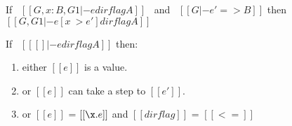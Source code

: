 \begin{lemma}[Substitution]
\label{lemma:union:substitution}
  If \ $[[G, x:B , G1 |- e dirflag A]]$ \ and \ $[[G |- e' => B]]$
  then \ $[[G, G1 |- e [ x ~> e' ] dirflag A]]$
\end{lemma}

\begin{lemma}[Progress]
\label{lemma:union:progress}
If \ $[[ [] |- e dirflag A]]$ then:
 \begin{enumerate}
  \item either $[[e]]$ is a value.
  \item or $[[e]]$ can take a step to $[[e']]$.
  \item or $[[e]]$ = $[[\x.e]]$ and $[[dirflag]]$ = $[[<=]]$
  \end{enumerate}
\end{lemma}

\begin{comment}
\begin{proof}
By induction on typing relation.
  \begin{itemize}
    \item Cases \rref{typ-int, typ-var, typ-app, typ-sub, typ-abs} are trivial to prove.
    \item Case \rref{typ-anno} requires \cref{lemma:union:value-not-value}.
    \item Case \rref{typ-typeof} requires 
    \cref{lemma:union:check-pexpr-ann,lemma:union:check-or-typ,lemma:union:pexpr-inf-typ}.
  \end{itemize}
\end{proof}

\begin{lemma}[Value Decidability]
\label{lemma:union:value-not-value}
$\forall$ $[[e]]$, \ value \ $[[e]]$ \ $\vee$ \ $\neg$ value \ $[[e]]$.
\end{lemma}

\begin{lemma}[check-or-typ]
\label{lemma:union:check-or-typ}
If \ $[[A *s B]]$ \ and \ $[[G |- p <= A \/ B]]$ \ then:
  \begin{enumerate}
    \item either \ $[[G |- p <= A]]$
    \item or \ $[[G |- p <= B]]$
  \end{enumerate}
\end{lemma}

\begin{lemma}[pexpr-inf-typ]
\label{lemma:union:pexpr-inf-typ}
If \ $[[G |- p <= A]]$ \ then:
  \begin{enumerate}
  \item $\exists$ $[[B]]$, \ $[[B <: A]]$
  \item and \ $[[G |- p => B]]$
  \end{enumerate}
\end{lemma}
\end{comment}

